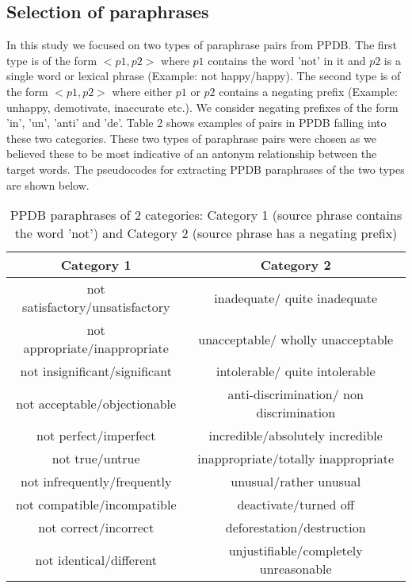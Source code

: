 \documentclass[11pt]{article}
\begin{document}
\subsection{Selection of paraphrases}
In this study we focused on two types of paraphrase pairs from PPDB. The first type is of the form $<p1, p2>$ where $p1$ contains the word 'not' in it and $p2$ is a single word or lexical phrase (Example: not happy/happy). The second type is of the form $<p1, p2>$ where either $p1$ or $p2$ contains a negating prefix (Example: unhappy, demotivate, inaccurate etc.). We consider negating prefixes of the form 'in', 'un', 'anti' and 'de'. Table 2 shows examples of pairs in PPDB falling into these two categories. These two types of paraphrase pairs were chosen as we believed these to be most indicative of an antonym relationship between the target words. The pseudocodes for extracting PPDB paraphrases of the two types are shown below.
\begin{table*}[h!]
\centering
 \begin{tabular}{|c | c|} 
 \hline
 Category 1 & Category 2 \\ [0.5ex] 
 \hline
 not satisfactory/unsatisfactory & inadequate/ quite inadequate\\
 not appropriate/inappropriate & unacceptable/ wholly unacceptable\\
 not insignificant/significant & intolerable/ quite intolerable\\
 not acceptable/objectionable & anti-discrimination/ non discrimination\\
 not perfect/imperfect & incredible/absolutely incredible\\
 not true/untrue & inappropriate/totally inappropriate\\
 not infrequently/frequently & unusual/rather unusual\\
 not compatible/incompatible & deactivate/turned off\\
 not correct/incorrect & deforestation/destruction\\
 not identical/different & unjustifiable/completely unreasonable\\
 \hline
\end{tabular}
\caption{PPDB paraphrases of 2 categories: Category 1 (source phrase contains the word 'not') and Category 2 (source phrase has a negating prefix)}
\end{table*}
\end{document}
